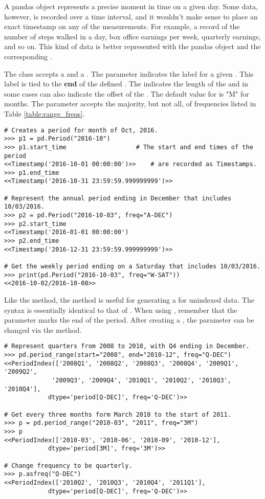 A pandas  object represents a precise moment in time on a given day.
Some data, however, is recorded over a time interval, and it wouldn't make sense to place an exact timestamp on any of the measurements.
For example, a record of the number of steps walked in a day, box office earnings per week, quarterly earnings, and so on.
This kind of data is better represented with the pandas  object and the corresponding .

The  class accepts a  and a .
The  parameter indicates the label for a given .
This label is tied to the \textbf{end} of the defined .
The  indicates the length of the  and in some cases can also indicate the offset of the .
The default value for  is "M" for months.
The  parameter accepts the majority, but not all, of frequencies listed in Table \ref{table:range_freqs}.

\begin{lstlisting}
# Creates a period for month of Oct, 2016.
>>> p1 = pd.Period("2016-10")
>>> p1.start_time                   # The start and end times of the period
<<Timestamp('2016-10-01 00:00:00')>>    # are recorded as Timestamps.
>>> p1.end_time
<<Timestamp('2016-10-31 23:59:59.999999999')>>

# Represent the annual period ending in December that includes 10/03/2016.
>>> p2 = pd.Period("2016-10-03", freq="A-DEC")
>>> p2.start_time
<<Timestamp('2016-01-01 00:00:00')
>>> p2.end_time
<<Timestamp('2016-12-31 23:59:59.999999999')>>

# Get the weekly period ending on a Saturday that includes 10/03/2016.
>>> print(pd.Period("2016-10-03", freq="W-SAT"))
<<2016-10-02/2016-10-08>>
\end{lstlisting}

Like the  method, the  method is useful for generating a  for unindexed data.
The syntax is essentially identical to that of .
When using , remember that the  parameter marks the end of the period.
After creating a , the  parameter can be changed via the  method.

\begin{lstlisting}
# Represent quarters from 2008 to 2010, with Q4 ending in December.
>>> pd.period_range(start="2008", end="2010-12", freq="Q-DEC")
<<PeriodIndex(['2008Q1', '2008Q2', '2008Q3', '2008Q4', '2009Q1', '2009Q2',
             '2009Q3', '2009Q4', '2010Q1', '2010Q2', '2010Q3', '2010Q4'],
            dtype='period[Q-DEC]', freq='Q-DEC')>>

# Get every three months form March 2010 to the start of 2011.
>>> p = pd.period_range("2010-03", "2011", freq="3M")
>>> p
<<PeriodIndex(['2010-03', '2010-06', '2010-09', '2010-12'],
            dtype='period[3M]', freq='3M')>>

# Change frequency to be quarterly.
>>> p.asfreq("Q-DEC")
<<PeriodIndex(['2010Q2', '2010Q3', '2010Q4', '2011Q1'],
            dtype='period[Q-DEC]', freq='Q-DEC')>>
\end{lstlisting}

